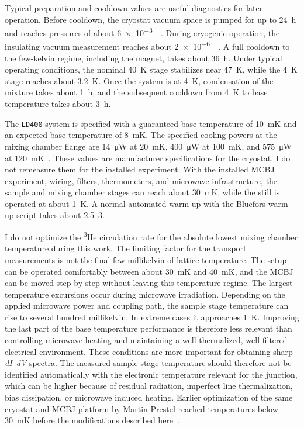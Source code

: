         Typical preparation and cooldown values are useful diagnostics for later operation. Before cooldown, the cryostat vacuum space is pumped for up to \qty{24}{\hour} and reaches pressures of about \qty{6e-3}{\milli\barunit}. During cryogenic operation, the insulating vacuum measurement reaches about \qty{2e-6}{\milli\barunit}. A full cooldown to the few-kelvin regime, including the magnet, takes about \qty{36}{\hour}. Under typical operating conditions, the nominal \qty{40}{\kelvin} stage stabilizes near \qty{47}{\kelvin}, while the \qty{4}{\kelvin} stage reaches about \qty{3.2}{\kelvin}. Once the system is at \qty{4}{\kelvin}, condensation of the mixture takes about \qty{1}{\hour}, and the subsequent cooldown from \qty{4}{\kelvin} to base temperature takes about \qty{3}{\hour}.

        The \texttt{LD400} system is specified with a guaranteed base temperature of \qty{10}{\milli\kelvin} and an expected base temperature of \qty{8}{\milli\kelvin}. The specified cooling powers at the mixing chamber flange are \qty{14}{\micro\watt} at \qty{20}{\milli\kelvin}, \qty{400}{\micro\watt} at \qty{100}{\milli\kelvin}, and \qty{575}{\micro\watt} at \qty{120}{\milli\kelvin}~\cite{bluefors_ld_dilution_2026}. These values are manufacturer specifications for the cryostat. I do not remeasure them for the installed experiment. With the installed MCBJ experiment, wiring, filters, thermometers, and microwave infrastructure, the sample and mixing chamber stages can reach about \qty{30}{\milli\kelvin}, while the still is operated at about \qty{1}{\kelvin}. A normal automated warm-up with the Bluefors warm-up script takes about \qtyrange{2.5}{3}{\dayunit}.

        I do not optimize the \textsuperscript{3}He circulation rate for the absolute lowest mixing chamber temperature during this work. The limiting factor for the transport measurements is not the final few millikelvin of lattice temperature. The setup can be operated comfortably between about \qty{30}{\milli\kelvin} and \qty{40}{\milli\kelvin}, and the MCBJ can be moved step by step without leaving this temperature regime. The largest temperature excursions occur during microwave irradiation. Depending on the applied microwave power and coupling path, the sample stage temperature can rise to several hundred millikelvin. In extreme cases it approaches \qty{1}{\kelvin}. Improving the last part of the base temperature performance is therefore less relevant than controlling microwave heating and maintaining a well-thermalized, well-filtered electrical environment. These conditions are more important for obtaining sharp \textit{dI--dV} spectra. The measured sample stage temperature should therefore not be identified automatically with the electronic temperature relevant for the junction, which can be higher because of residual radiation, imperfect line thermalization, bias dissipation, or microwave induced heating. Earlier optimization of the same cryostat and MCBJ platform by Martin Prestel reached temperatures below \qty{30}{\milli\kelvin} before the modifications described here~\cite{prestel_magnetic_2020}.

